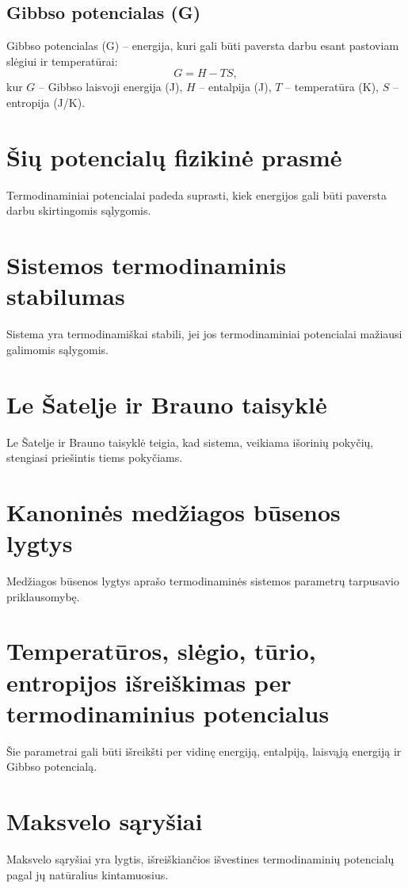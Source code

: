 \documentclass[a4paper,12pt]{article}
\begin{document}
\subsection{Gibbso potencialas (G)}
Gibbso potencialas (G) – energija, kuri gali būti paversta darbu esant pastoviam slėgiui ir temperatūrai:
\[
G = H - TS,
\]
kur $G$ – Gibbso laisvoji energija (J), $H$ – entalpija (J), $T$ – temperatūra (K), $S$ – entropija (J/K).

\section{Šių potencialų fizikinė prasmė}
Termodinaminiai potencialai padeda suprasti, kiek energijos gali būti paversta darbu skirtingomis sąlygomis.

\section{Sistemos termodinaminis stabilumas}
Sistema yra termodinamiškai stabili, jei jos termodinaminiai potencialai mažiausi galimomis sąlygomis.

\section{Le Šatelje ir Brauno taisyklė}
Le Šatelje ir Brauno taisyklė teigia, kad sistema, veikiama išorinių pokyčių, stengiasi priešintis tiems pokyčiams.

\section{Kanoninės medžiagos būsenos lygtys}
Medžiagos būsenos lygtys aprašo termodinaminės sistemos parametrų tarpusavio priklausomybę.

\section{Temperatūros, slėgio, tūrio, entropijos išreiškimas per termodinaminius potencialus}
Šie parametrai gali būti išreikšti per vidinę energiją, entalpiją, laisvąją energiją ir Gibbso potencialą.

\section{Maksvelo sąryšiai}
Maksvelo sąryšiai yra lygtis, išreiškiančios išvestines termodinaminių potencialų pagal jų natūralius kintamuosius.
\end{document}
